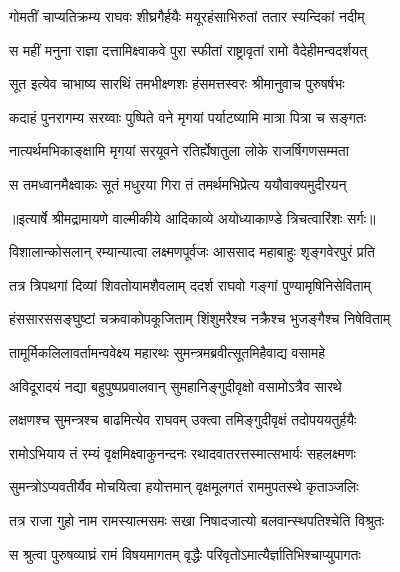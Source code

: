 \twolineshloka
{गोमतीं चाप्यतिक्रम्य राघवः शीघ्रगैर्हयैः}
{मयूरहंसाभिरुतां ततार स्यन्दिकां नदीम्} %

\twolineshloka
{स महीं मनुना राज्ञा दत्तामिक्ष्वाकवे पुरा}
{स्फीतां राष्ट्रावृतां रामो वैदेहीमन्वदर्शयत्} %

\twolineshloka
{सूत इत्येव चाभाष्य सारथिं तमभीक्ष्णशः}
{हंसमत्तस्वरः श्रीमानुवाच पुरुषर्षभः} %

\twolineshloka
{कदाहं पुनरागम्य सरय्वाः पुष्पिते वने}
{मृगयां पर्याटष्यामि मात्रा पित्रा च सङ्गतः} %

\twolineshloka
{नात्यर्थमभिकाङ्क्षामि मृगयां सरयूवने}
{रतिर्ह्येषातुला लोके राजर्षिगणसम्मता} %

\twolineshloka
{स तमध्वानमैक्ष्वाकः सूतं मधुरया गिरा}
{तं तमर्थमभिप्रेत्य ययौवाक्यमुदीरयन्} %


{॥इत्यार्षे श्रीमद्रामायणे वाल्मीकीये आदिकाव्ये अयोध्याकाण्डे त्रिचत्वारिंशः सर्गः॥}


\twolineshloka
{विशालान्कोसलान् रम्यान्यात्वा लक्ष्मणपूर्वजः}
{आससाद महाबाहुः शृङ्गवेरपुरं प्रति} %

\twolineshloka
{तत्र त्रिपथगां दिव्यां शिवतोयामशैवलाम्}
{ददर्श राघवो गङ्गां पुण्यामृषिनिसेविताम्} %

\twolineshloka
{हंससारससङ्घुष्टां चक्रवाकोपकूजिताम्}
{शिंशुमरैश्च नक्रैश्च भुजङ्गैश्च निषेविताम्} %

\twolineshloka
{तामूर्मिकलिलावर्तामन्ववेक्ष्य महारथः}
{सुमन्त्रमब्रवीत्सूतमिहैवाद्य वसामहे} %

\twolineshloka
{अविदूरादयं नद्या बहुपुष्पप्रवालवान्}
{सुमहानिङ्गुदीवृक्षो वसामोऽत्रैव सारथे} %

\twolineshloka
{लक्षणश्च सुमन्त्रश्च बाढमित्येव राघवम्}
{उक्त्वा तमिङ्गुदीवृक्षं तदोपययतुर्हयैः} %

\twolineshloka
{रामोऽभियाय तं रम्यं वृक्षमिक्ष्वाकुनन्दनः}
{रथादवातरत्तस्मात्सभार्यः सहलक्ष्मणः} %

\twolineshloka
{सुमन्त्रोऽप्यवतीर्यैव मोचयित्वा हयोत्तमान्}
{वृक्षमूलगतं राममुपतस्थे कृताञ्जलिः} %

\twolineshloka
{तत्र राजा गुहो नाम रामस्यात्मसमः सखा}
{निषादजात्यो बलवान्स्थपतिश्चेति विश्रुतः} %

\twolineshloka
{स श्रुत्वा पुरुषव्याघ्रं रामं विषयमागतम्}
{वृद्धैः परिवृतोऽमात्यैर्ज्ञातिभिश्चाप्युपागतः} %

